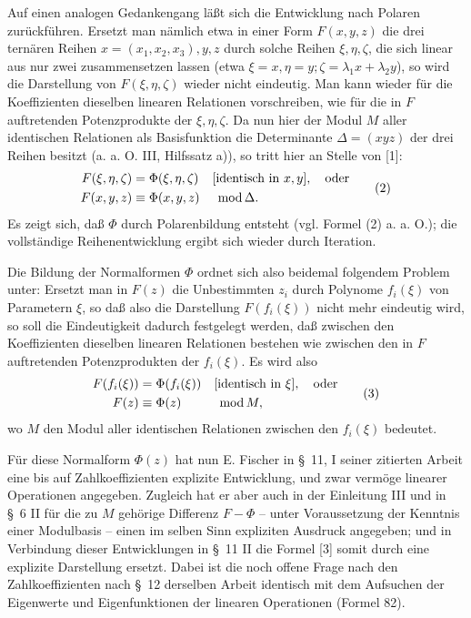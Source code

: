 \documentclass[11pt]{article}
\providecommand{\modu}[1]{\;\operatorname{mod} #1}
\begin{document}
Auf einen analogen Gedankengang läßt sich die Entwicklung nach Polaren zurückführen. Ersetzt man nämlich etwa in einer Form $F(x,y,z)$ die drei ternären Reihen $x=(x_1,x_2,x_3),y,z$ durch solche Reihen $\xi,\eta,\zeta$, die sich linear aus nur zwei zusammensetzen lassen (etwa $\xi=x,\eta=y;\zeta=\lambda_1x+\lambda_2y$), so wird die Darstellung von $F(\xi,\eta,\zeta)$ wieder nicht eindeutig. Man kann wieder für die Koeffizienten dieselben linearen Relationen vorschreiben, wie für die in $F$ auftretenden Potenzprodukte der $\xi,\eta,\zeta$. Da nun hier der Modul $M$ aller identischen Relationen als Basisfunktion die Determinante $\Delta=(xyz)$ der drei Reihen besitzt (a. a. O. III, Hilfssatz a)), so tritt hier an Stelle von [1]:
\begin{equation}
\begin{aligned}
        F(\xi,\eta,\zeta)&=\Phi(\xi,\eta,\zeta)&&[\text{identisch in }x,y],\quad\text{oder}\notag\\
        F(x,y,z)&\equiv\Phi(x,y,z)&&\modu{\Delta}.
\end{aligned}
\tag{2}
\end{equation}
Es zeigt sich, daß $\Phi$ durch Polarenbildung entsteht (vgl. Formel (2) a. a. O.); die vollständige Reihenentwicklung ergibt sich wieder durch Iteration.

Die Bildung der Normalformen $\Phi$ ordnet sich also beidemal folgendem Problem unter: Ersetzt man in $F(z)$ die Unbestimmten $z_i$ durch Polynome $f_i(\xi)$ von Parametern $\xi$, so daß also die Darstellung $F(f_i(\xi))$ nicht mehr eindeutig wird, so soll die Eindeutigkeit dadurch festgelegt werden, daß zwischen den Koeffizienten dieselben linearen Relationen bestehen wie zwischen den in $F$ auftretenden Potenzprodukten der $f_i(\xi)$. Es wird also
\begin{equation}
\begin{aligned}
        F(f_i(\xi))&=\Phi(f_i(\xi))&&[\text{identisch in }\xi],\quad\text{oder}\notag\\
        F(z)&\equiv\Phi(z)&&\modu{M},
\end{aligned}
\tag{3}
\end{equation}
wo $M$ den Modul aller identischen Relationen zwischen den $f_i(\xi)$ bedeutet.

Für diese Normalform $\Phi(z)$ hat nun E. Fischer in \S~11, I seiner zitierten Arbeit eine bis auf Zahlkoeffizienten explizite Entwicklung, und zwar vermöge linearer Operationen angegeben. Zugleich hat er aber auch in der Einleitung III und in \S~6 II für die zu $M$ gehörige Differenz $F-\Phi$ -- unter Voraussetzung der Kenntnis einer Modulbasis -- einen im selben Sinn expliziten Ausdruck angegeben; und in Verbindung dieser Entwicklungen in \S~11 II die Formel [3] somit durch eine explizite Darstellung ersetzt. Dabei ist die noch offene Frage nach den Zahlkoeffizienten nach \S~12 derselben Arbeit identisch mit dem Aufsuchen der Eigenwerte und Eigenfunktionen der linearen Operationen (Formel 82).
\end{document}

